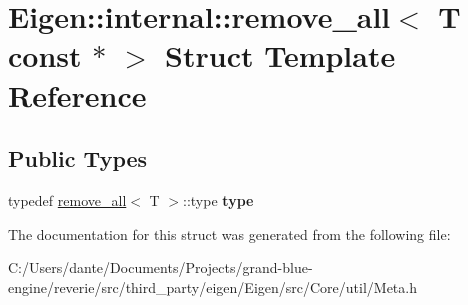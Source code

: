 \hypertarget{struct_eigen_1_1internal_1_1remove__all_3_01_t_01const_01_5_01_4}{}\section{Eigen\+::internal\+::remove\+\_\+all$<$ T const $\ast$ $>$ Struct Template Reference}
\label{struct_eigen_1_1internal_1_1remove__all_3_01_t_01const_01_5_01_4}
\subsection*{Public Types}
\begin{DoxyCompactItemize}
\item 
\mbox{\label{struct_eigen_1_1internal_1_1remove__all_3_01_t_01const_01_5_01_4_a80ee851cf5d48a096726086ade4c65a8}} 
typedef \mbox{\hyperlink{struct_eigen_1_1internal_1_1remove__all}{remove\+\_\+all}}$<$ T $>$\+::type {\bfseries type}
\end{DoxyCompactItemize}


The documentation for this struct was generated from the following file\+:\begin{DoxyCompactItemize}
\item 
C\+:/\+Users/dante/\+Documents/\+Projects/grand-\/blue-\/engine/reverie/src/third\+\_\+party/eigen/\+Eigen/src/\+Core/util/Meta.\+h\end{DoxyCompactItemize}
